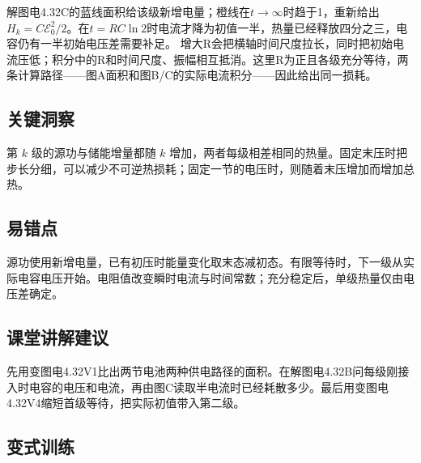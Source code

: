 \documentclass[UTF8,fontset=fandol,a4paper,11pt]{ctexart}
\begin{document}
解图电4.32C的蓝线面积给该级新增电量；橙线在$t\to\infty$时趋于1，重新给出$H_k=C\mathcal E_0^2/2$。在$t=RC\ln2$时电流才降为初值一半，热量已经释放四分之三，电容仍有一半初始电压差需要补足。
增大R会把横轴时间尺度拉长，同时把初始电流压低；积分中的R和时间尺度、振幅相互抵消。这里R为正且各级充分等待，两条计算路径——图A面积和图B/C的实际电流积分——因此给出同一损耗。




\subsection*{关键洞察}

第 $k$ 级的源功与储能增量都随 $k$ 增加，两者每级相差相同的热量。固定末压时把步长分细，可以减少不可逆热损耗；固定一节的电压时，则随着末压增加而增加总热。



\subsection*{易错点}

源功使用新增电量，已有初压时能量变化取末态减初态。有限等待时，下一级从实际电容电压开始。电阻值改变瞬时电流与时间常数；充分稳定后，单级热量仅由电压差确定。



\subsection*{课堂讲解建议}

先用变图电4.32V1比出两节电池两种供电路径的面积。在解图电4.32B问每级刚接入时电容的电压和电流，再由图C读取半电流时已经耗散多少。最后用变图电4.32V4缩短首级等待，把实际初值带入第二级。


\subsection*{变式训练}
\end{document}
